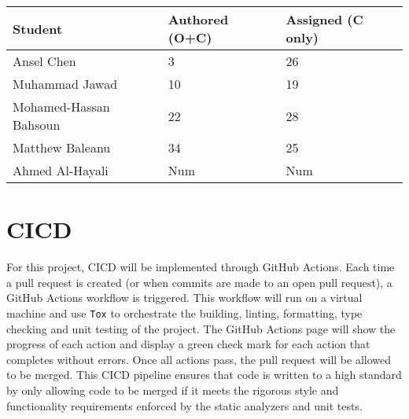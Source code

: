 \documentclass{article}
\begin{document}

\begin{table}[H]
\centering
\begin{tabular}{lll}
\toprule
\textbf{Student} & \textbf{Authored (O+C)} & \textbf{Assigned (C only)}\\
\midrule
Ansel Chen & 3 & 26 \\
Muhammad Jawad & 10 & 19 \\
Mohamed-Hassan Bahsoun & 22 & 28 \\
Matthew Baleanu & 34 & 25 \\
Ahmed Al-Hayali & Num & Num \\
\bottomrule
\end{tabular}
\end{table}


\section{CICD}
For this project, CICD will be implemented through GitHub Actions. Each time a pull
request is created (or when commits are made to an open pull request), a GitHub Actions
workflow is triggered. This workflow will run on a virtual machine and use \texttt{Tox}
to orchestrate the building, linting, formatting, type checking and unit testing
of the project. The GitHub Actions page will show the progress of each action and display
a green check mark for each action that completes without errors. Once all actions pass, 
the pull request will be allowed to be merged. This CICD pipeline ensures that code is 
written to a high standard by only allowing code to be merged if it meets the rigorous
style and functionality requirements enforced by the static analyzers and unit tests.

\end{document}
